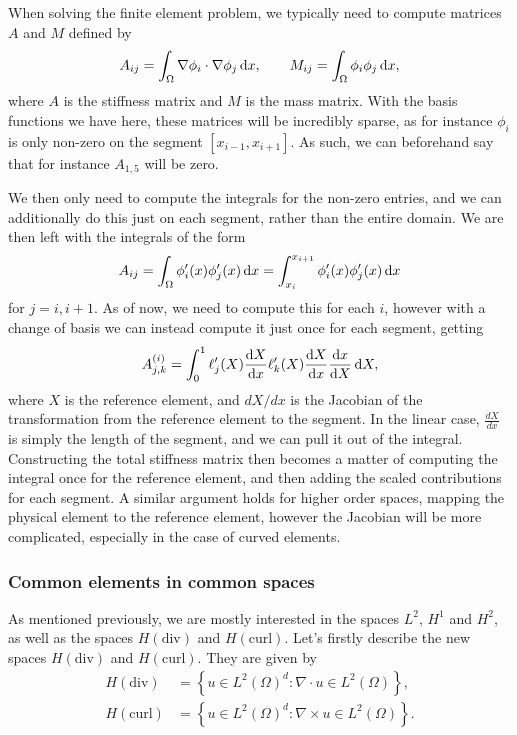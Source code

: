 When solving the finite element problem, we typically need to compute matrices $A$ and $M$ defined by
\begin{equation}
    A_{ij} = \int_{\Omega} \nabla \phi_i \cdot \nabla \phi_j \mathop{}\!\mathrm{d} x,
    \qquad
    M_{ij} = \int_{\Omega} \phi_i \phi_j \mathop{}\!\mathrm{d} x,
\end{equation}
where $A$ is the stiffness matrix and $M$ is the mass matrix.
With the basis functions we have here, these matrices will be incredibly sparse, as for instance $\phi_i$ is only non-zero on the segment $[x_{i-1}, x_{i+1}]$.
As such, we can beforehand say that for instance $A_{1,5}$ will be zero.

We then only need to compute the integrals for the non-zero entries, and we can additionally do this just on each segment, rather than the entire domain.
We are then left with the integrals of the form
\begin{equation}
    A_{ij}
    = \int_\Omega \phi'_i(x) \phi'_j(x) \mathop{}\!\mathrm{d} x
    = \int_{x_i}^{x_{i+1}} \phi'_i(x) \phi'_j(x) \mathop{}\!\mathrm{d} x
\end{equation}
for $j = i, i+1$.
As of now, we need to compute this for each $i$, however with a change of basis we can instead compute it just once for each segment, getting
\begin{equation}
    A_{j, k}^{(i)} = \int_{0}^{1} \ell'_j(X) \frac{\mathop{}\!\mathrm{d} X}{\mathop{}\!\mathrm{d} x} \ell'_k(X) \frac{\mathop{}\!\mathrm{d} X}{\mathop{}\!\mathrm{d} x} \frac{\mathop{}\!\mathrm{d} x}{\mathop{}\!\mathrm{d} X} \mathop{}\!\mathrm{d} X,
\end{equation}
where $X$ is the reference element, and $dX/dx$ is the Jacobian of the transformation from the reference element to the segment.
In the linear case, $\frac{dX}{dx}$ is simply the length of the segment, and we can pull it out of the integral.
Constructing the total stiffness matrix then becomes a matter of computing the integral once for the reference element, and then adding the scaled contributions for each segment.
A similar argument holds for higher order spaces, mapping the physical element to the reference element, however the Jacobian will be more complicated, especially in the case of curved elements.

\subsubsection{Common elements in common spaces}
As mentioned previously, we are mostly interested in the spaces $L^2$, $H^1$ and $H^2$, as well as the spaces $H(\mathrm{div})$ and $H(\mathrm{curl})$.
Let's firstly describe the new spaces $H(\mathrm{div})$ and $H(\mathrm{curl})$.
They are given by
\begin{equation}
    \begin{split}
        H(\mathrm{div}) &= \left\{ u \in L^2(\Omega)^d : \nabla \cdot u \in L^2(\Omega) \right\},\\
        H(\mathrm{curl}) &= \left\{ u \in L^2(\Omega)^d : \nabla \times u \in L^2(\Omega) \right\}.
    \end{split}
\end{equation}

